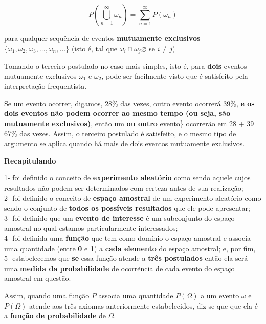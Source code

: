 \documentclass[
]{book}
\begin{document}
\[
P\left(\bigcup _{n=1}^{\infty }{\omega}_{n}\right)=\sum _{n=1}^{\infty }P\left({\omega}_{n}\right)
\]

\hfill\break

para qualquer sequência de eventos \textbf{mutuamente exclusivos} \(\{\omega_{1}, \omega_{2}, \omega_{3}, ..., \omega_{n}, ...\}\) (isto é, tal que \(\omega_{i} \cap \omega_{j} \varnothing\) se \(i \neq j\))

\hfill\break

Tomando o terceiro postulado no caso mais simples, isto é, para \textbf{dois} eventos mutuamente exclusivos \(\omega_{1}\) e \(\omega_{2}\), pode ser facilmente visto que é satisfeito pela interpretação frequentista.

\hfill\break

Se um evento ocorrer, digamos, 28\% das vezes, outro evento ocorrerá 39\%, \textbf{e os dois eventos não podem ocorrer ao mesmo tempo (ou seja, são mutuamente exclusivos)}, então um \textbf{ou outro} evento\} ocorrerão em 28 + 39 = 67\% das vezes. Assim, o terceiro postulado é satisfeito, e o mesmo tipo de argumento se aplica quando há mais de dois eventos mutuamente exclusivos.

\hfill\break

\textbf{Recapitulando}

\hfill\break

1- foi definido o conceito de \textbf{experimento aleatório} como sendo aquele cujos resultados não podem ser determinados com certeza antes de sua realização;\\
2- foi definido o conceito de \textbf{espaço amostral} de um experimento aleatório como sendo o conjunto de \textbf{todos os possíveis resultados} que ele pode apresentar;\\
3- foi definido que um \textbf{evento de interesse} é um subconjunto do espaço amostral no qual estamos particularmente interessados;\\
4- foi definida uma \textbf{função} que tem como domínio o espaço amostral e associa uma quantidade (entre \textbf{0} e \textbf{1}) a \textbf{cada elemento} do espaço amostral; e, por fim,\\
5- estabelecemos que \textbf{se} essa função atende a \textbf{três postulados} então ela será uma \textbf{medida da probabilidade} de ocorrẽncia de cada evento do espaço amostral em questão.

\hfill\break

Assim, quando uma função \(P\) associa uma quantidade \(P(\Omega)\) a um evento \(\omega\) e \(P(\Omega)\) atende aos três axiomas anteriormente estabelecidos, diz-se que que ela é a \textbf{função de probabilidade} de \(\Omega\).
\end{document}
